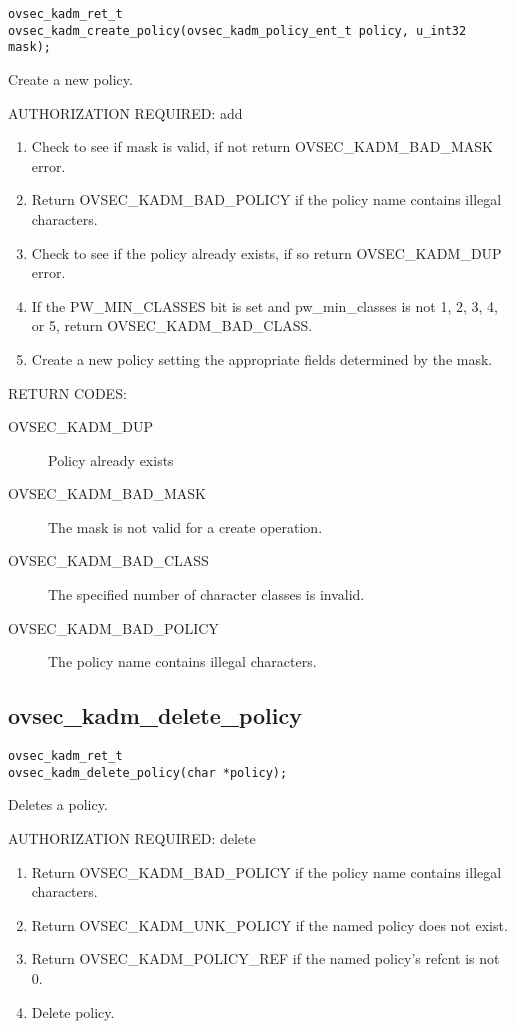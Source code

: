 \begin{verbatim}
ovsec_kadm_ret_t
ovsec_kadm_create_policy(ovsec_kadm_policy_ent_t policy, u_int32 mask); 
\end{verbatim}

Create a new policy.

AUTHORIZATION REQUIRED: add

\begin{enumerate}
\item Check to see if mask is valid, if not return OVSEC_KADM_BAD_MASK error.
\item Return OVSEC_KADM_BAD_POLICY if the policy name contains illegal
characters.

\item Check to see if the policy already exists, if so return
OVSEC_KADM_DUP error. 
\item If the PW_MIN_CLASSES bit is set and pw_min_classes is not 1, 2,
3, 4, or 5, return OVSEC_KADM_BAD_CLASS.
\item Create a new policy setting the appropriate fields determined
by the mask.
\end{enumerate}

RETURN CODES:

\begin{description}
\item[OVSEC_KADM_DUP] Policy already exists
\item[OVSEC_KADM_BAD_MASK] The mask is not valid for a create
operation.
\item[OVSEC_KADM_BAD_CLASS] The specified number of character classes
is invalid.
\item[OVSEC_KADM_BAD_POLICY] The policy name contains illegal characters.
\end{description}

\subsection{ovsec_kadm_delete_policy}

\begin{verbatim}
ovsec_kadm_ret_t
ovsec_kadm_delete_policy(char *policy);
\end{verbatim}

Deletes a policy.

AUTHORIZATION REQUIRED: delete

\begin{enumerate}
\item Return OVSEC_KADM_BAD_POLICY if the policy name contains illegal
characters.
\item Return OVSEC_KADM_UNK_POLICY if the named policy does not exist.
\item Return OVSEC_KADM_POLICY_REF if the named policy's refcnt is not 0.
\item Delete policy.
\end{enumerate}

